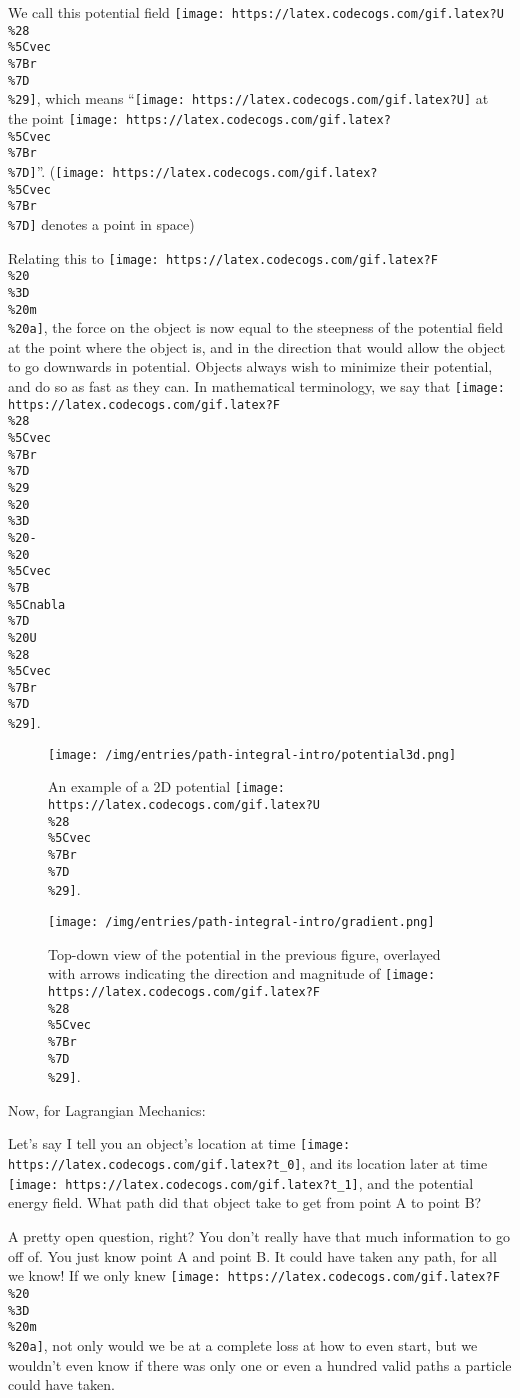 \documentclass[]{article}
\begin{document}
We call this potential field
\texttt{[image: https://latex.codecogs.com/gif.latex?U\\\%28\\\%5Cvec\\\%7Br\\\%7D\\\%29]},
which means ``\texttt{[image: https://latex.codecogs.com/gif.latex?U]} at the
point \texttt{[image: https://latex.codecogs.com/gif.latex?\\\%5Cvec\\\%7Br\\\%7D]}''.
(\texttt{[image: https://latex.codecogs.com/gif.latex?\\\%5Cvec\\\%7Br\\\%7D]} denotes
a point in space)

Relating this to
\texttt{[image: https://latex.codecogs.com/gif.latex?F\\\%20\\\%3D\\\%20m\\\%20a]}, the
force on the object is now equal to the steepness of the potential field at the
point where the object is, and in the direction that would allow the object to
go downwards in potential. Objects always wish to minimize their potential, and
do so as fast as they can. In mathematical terminology, we say that
\texttt{[image: https://latex.codecogs.com/gif.latex?F\\\%28\\\%5Cvec\\\%7Br\\\%7D\\\%29\\\%20\\\%3D\\\%20-\\\%20\\\%5Cvec\\\%7B\\\%5Cnabla\\\%7D\\\%20U\\\%28\\\%5Cvec\\\%7Br\\\%7D\\\%29]}.

\begin{figure}
\centering
\texttt{[image: /img/entries/path-integral-intro/potential3d.png]}
\caption{An example of a 2D potential
\texttt{[image: https://latex.codecogs.com/gif.latex?U\\\%28\\\%5Cvec\\\%7Br\\\%7D\\\%29]}.}
\end{figure}

\begin{figure}
\centering
\texttt{[image: /img/entries/path-integral-intro/gradient.png]}
\caption{Top-down view of the potential in the previous figure, overlayed with
arrows indicating the direction and magnitude of
\texttt{[image: https://latex.codecogs.com/gif.latex?F\\\%28\\\%5Cvec\\\%7Br\\\%7D\\\%29]}.}
\end{figure}

Now, for Lagrangian Mechanics:

Let's say I tell you an object's location at time
\texttt{[image: https://latex.codecogs.com/gif.latex?t\_0]}, and its location
later at time \texttt{[image: https://latex.codecogs.com/gif.latex?t\_1]}, and
the potential energy field. What path did that object take to get from point A
to point B?

A pretty open question, right? You don't really have that much information to go
off of. You just know point A and point B. It could have taken any path, for all
we know! If we only knew
\texttt{[image: https://latex.codecogs.com/gif.latex?F\\\%20\\\%3D\\\%20m\\\%20a]}, not
only would we be at a complete loss at how to even start, but we wouldn't even
know if there was only one or even a hundred valid paths a particle could have
taken.
\end{document}
